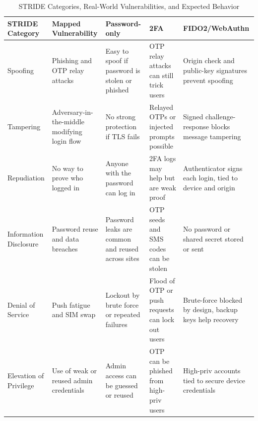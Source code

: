 \begin{table}[t]
\centering
\small
\caption{STRIDE Categories, Real-World Vulnerabilities, and Expected Behavior}
\label{tab:stride-vuln-matrix}
\begin{tabular}{|p{2cm}|p{3.5cm}|p{2.8cm}|p{2.8cm}|p{2.8cm}|}
\hline
\textbf{STRIDE Category} & \textbf{Mapped Vulnerability} & \textbf{Password-only} & \textbf{2FA} & \textbf{FIDO2/WebAuthn} \\
\hline
Spoofing & Phishing and OTP relay attacks & Easy to spoof if password is stolen or phished & OTP relay attacks can still trick users & Origin check and public-key signatures prevent spoofing \\
\hline
Tampering & Adversary-in-the-middle modifying login flow & No strong protection if TLS fails & Relayed OTPs or injected prompts possible & Signed challenge-response blocks message tampering \\
\hline
Repudiation & No way to prove who logged in & Anyone with the password can log in & 2FA logs may help but are weak proof & Authenticator signs each login, tied to device and origin \\
\hline
Information Disclosure & Password reuse and data breaches & Password leaks are common and reused across sites & OTP seeds and SMS codes can be stolen & No password or shared secret stored or sent \\
\hline
Denial of Service & Push fatigue and SIM swap & Lockout by brute force or repeated failures & Flood of OTP or push requests can lock out users & Brute-force blocked by design, backup keys help recovery \\
\hline
Elevation of Privilege & Use of weak or reused admin credentials & Admin access can be guessed or reused & OTP can be phished from high-priv users & High-priv accounts tied to secure device credentials \\
\hline
\end{tabular}
\end{table}

